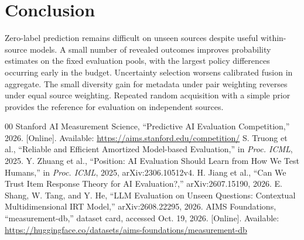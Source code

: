 \documentclass[conference]{IEEEtran}
\begin{document}
\section{Conclusion}
Zero-label prediction remains difficult on unseen sources despite useful within-source models. A small number of revealed outcomes improves probability estimates on the fixed evaluation pools, with the largest policy differences occurring early in the budget. Uncertainty selection worsens calibrated fusion in aggregate. The small diversity gain for metadata under pair weighting reverses under equal source weighting. Repeated random acquisition with a simple prior provides the reference for evaluation on independent sources.

\begin{thebibliography}{00}
 Stanford AI Measurement Science, ``Predictive AI Evaluation Competition,'' 2026. [Online]. Available: \url{https://aims.stanford.edu/competition/}
 S. Truong et al., ``Reliable and Efficient Amortized Model-based Evaluation,'' in \textit{Proc. ICML}, 2025.
 Y. Zhuang et al., ``Position: AI Evaluation Should Learn from How We Test Humans,'' in \textit{Proc. ICML}, 2025, arXiv:2306.10512v4.
 H. Jiang et al., ``Can We Trust Item Response Theory for AI Evaluation?,'' arXiv:2607.15190, 2026.
 E. Shang, W. Tang, and Y. He, ``LLM Evaluation on Unseen Questions: Contextual Multidimensional IRT Model,'' arXiv:2608.22295, 2026.
 AIMS Foundations, ``measurement-db,'' dataset card, accessed Oct. 19, 2026. [Online]. Available: \url{https://huggingface.co/datasets/aims-foundations/measurement-db}
\end{thebibliography}
\end{document}
